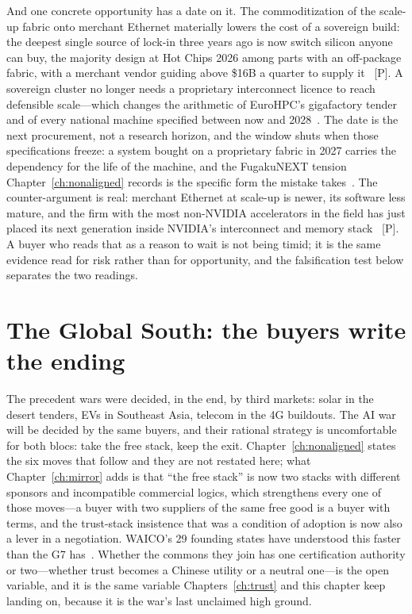 And one concrete opportunity has a date on it. The commoditization of the scale-up fabric onto merchant Ethernet materially lowers the cost of a sovereign build: the deepest single source of lock-in three years ago is now switch silicon anyone can buy, the majority design at Hot Chips 2026 among parts with an off-package fabric, with a merchant vendor guiding above \$16B a quarter to supply it~\cite{hc2026-scaleup,broadcom-q2fy26} [P]. A sovereign cluster no longer needs a proprietary interconnect licence to reach defensible scale---which changes the arithmetic of EuroHPC's gigafactory tender and of every national machine specified between now and 2028~\cite{eu-giga-tender}. The date is the next procurement, not a research horizon, and the window shuts when those specifications freeze: a system bought on a proprietary fabric in 2027 carries the dependency for the life of the machine, and the FugakuNEXT tension Chapter~\ref{ch:nonaligned} records is the specific form the mistake takes~\cite{fugakunext}. The counter-argument is real: merchant Ethernet at scale-up is newer, its software less mature, and the firm with the most non-NVIDIA accelerators in the field has just placed its next generation inside NVIDIA's interconnect and memory stack~\cite{aws-nvda} [P]. A buyer who reads that as a reason to wait is not being timid; it is the same evidence read for risk rather than for opportunity, and the falsification test below separates the two readings.

\section{The Global South: the buyers write the ending}

The precedent wars were decided, in the end, by third markets: solar in the desert tenders, EVs in Southeast Asia, telecom in the 4G buildouts. The AI war will be decided by the same buyers, and their rational strategy is uncomfortable for both blocs: take the free stack, keep the exit. Chapter~\ref{ch:nonaligned} states the six moves that follow and they are not restated here; what Chapter~\ref{ch:mirror} adds is that ``the free stack'' is now two stacks with different sponsors and incompatible commercial logics, which strengthens every one of those moves---a buyer with two suppliers of the same free good is a buyer with terms, and the trust-stack insistence that was a condition of adoption is now also a lever in a negotiation. WAICO's 29 founding states have understood this faster than the G7 has~\cite{waico}. Whether the commons they join has one certification authority or two---whether trust becomes a Chinese utility or a neutral one---is the open variable, and it is the same variable Chapters~\ref{ch:trust} and this chapter keep landing on, because it is the war's last unclaimed high ground.

